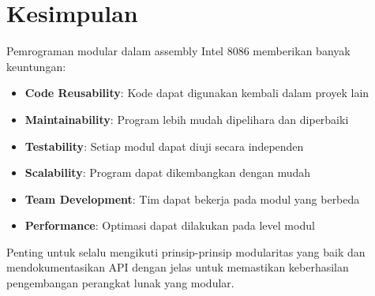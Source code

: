 \documentclass[../main.tex]{subfiles}
\begin{document}
    \section{Kesimpulan}
        Pemrograman modular dalam assembly Intel 8086 memberikan banyak keuntungan:

        \begin{itemize}
            \item \textbf{Code Reusability}: Kode dapat digunakan kembali dalam proyek lain
            \item \textbf{Maintainability}: Program lebih mudah dipelihara dan diperbaiki
            \item \textbf{Testability}: Setiap modul dapat diuji secara independen
            \item \textbf{Scalability}: Program dapat dikembangkan dengan mudah
            \item \textbf{Team Development}: Tim dapat bekerja pada modul yang berbeda
            \item \textbf{Performance}: Optimasi dapat dilakukan pada level modul
        \end{itemize}

        Penting untuk selalu mengikuti prinsip-prinsip modularitas yang baik dan mendokumentasikan API dengan jelas untuk memastikan keberhasilan pengembangan perangkat lunak yang modular.
\end{document}
